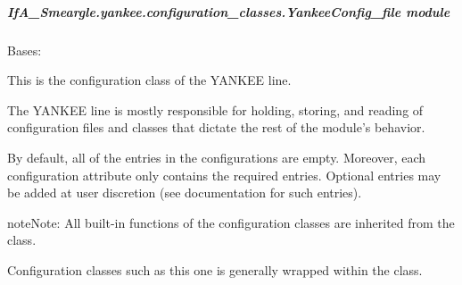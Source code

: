 \documentclass[letterpaper,10pt,english]{sphinxmanual}
\begin{document}
\subparagraph{IfA\_Smeargle.yankee.configuration\_classes.YankeeConfig\_file module}
\label{\detokenize{python_docstrings/IfA_Smeargle.yankee.configuration_classes.YankeeConfig_file:module-IfA_Smeargle.yankee.configuration_classes.YankeeConfig_file}}\label{\detokenize{python_docstrings/IfA_Smeargle.yankee.configuration_classes.YankeeConfig_file:ifa-smeargle-yankee-configuration-classes-yankeeconfig-file-module}}\label{\detokenize{python_docstrings/IfA_Smeargle.yankee.configuration_classes.YankeeConfig_file::doc}}

\begin{fulllineitems}
\label{\detokenize{python_docstrings/IfA_Smeargle.yankee.configuration_classes.YankeeConfig_file:IfA_Smeargle.yankee.configuration_classes.YankeeConfig_file.YankeeConfig}}
Bases: {\hyperref[\detokenize{python_docstrings/IfA_Smeargle.yankee.configuration_classes.BaseConfig_file:IfA_Smeargle.yankee.configuration_classes.BaseConfig_file.BaseConfig}]{}}

This is the configuration class of the YANKEE line.

The YANKEE line is mostly responsible for holding, storing, and reading
of configuration files and classes that dictate the rest  of the module’s
behavior.

By default, all of the entries in the configurations are empty. Moreover,
each configuration attribute only contains the required entries. Optional
entries may be added at user  discretion (see documentation for such
entries).

\begin{sphinxadmonition}{note}{Note:}
All built-in functions of the configuration classes are inherited from the
{\hyperref[\detokenize{python_docstrings/IfA_Smeargle.yankee.configuration_classes.BaseConfig_file:IfA_Smeargle.yankee.configuration_classes.BaseConfig_file.BaseConfig}]{}}
class.

Configuration classes such as this one is generally wrapped within the
{\hyperref[\detokenize{python_docstrings/IfA_Smeargle.yankee.yankee_main:IfA_Smeargle.yankee.yankee_main.SmeargleConfig}]{}} class.
\end{sphinxadmonition}

\end{fulllineitems}
\end{document}
